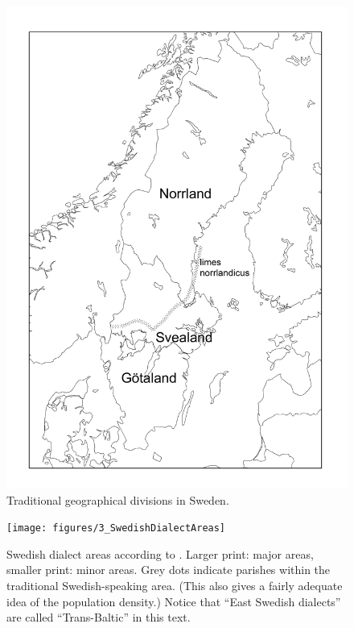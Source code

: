\begin{figure}[h]

\includegraphics[height=.3\textheight]{figures/2_TraditionalGeographicdivisions}
\caption{Traditional geographical divisions in Sweden.}
\label{map:1}

\end{figure}

\begin{figure}[h]
\texttt{[image: figures/3\_SwedishDialectAreas]}
\caption{Swedish dialect areas according to \citet{Wessén1966}. Larger print: major areas, smaller print: minor areas. Grey dots indicate parishes within the traditional Swedish-speaking area. (This also gives a fairly adequate idea of the population density.) Notice that “East Swedish dialects” are called “Trans-Baltic” in this text.}
\label{map:2}

\end{figure}

